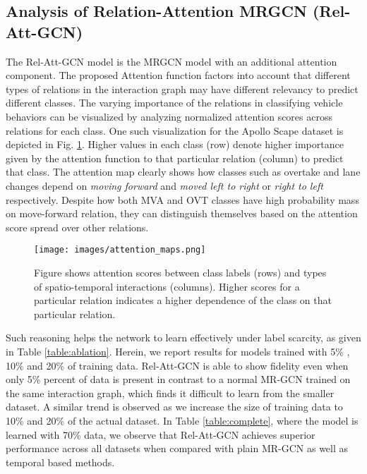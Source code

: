 \documentclass[letterpaper, 10 pt, conference]{ieeeconf}
\begin{document}
\subsection{Analysis of Relation-Attention MRGCN (Rel-Att-GCN)}
The Rel-Att-GCN model is the MRGCN model with an additional attention component. The proposed Attention function factors into account that different types of relations in the interaction graph may have different relevancy to predict different classes.  The varying importance of the relations in classifying vehicle behaviors can be visualized by analyzing normalized attention scores across relations for each class. One such visualization for the Apollo Scape dataset is depicted in Fig. \ref{fig:attention_map}. Higher values in each class (row) denote higher importance given by the attention function to that particular relation (column) to predict that class. The attention map clearly shows how classes such as overtake and lane changes depend on \textit{moving forward} and \textit{moved left to right} or \textit{right to left} respectively. Despite how both MVA and OVT classes have high probability mass on move-forward relation, they can distinguish themselves based on the attention score spread over other relations.
\begin{figure}[!ht]
    \centering
    \vspace{-4mm}
    \texttt{[image: images/attention\_maps.png]}
    \caption{\scriptsize Figure shows attention scores between class labels (rows) and types of spatio-temporal interactions (columns). Higher scores for a particular relation indicates a higher dependence of the class on that particular relation.
}
    \vspace{-2mm}
    \label{fig:attention_map}
\end{figure}

Such reasoning helps the network to learn effectively under label scarcity, as given in Table \ref{table:ablation}. Herein, we report results for models trained with 5\% , 10\% and 20\% of training data. Rel-Att-GCN is able to show fidelity even when only 5\% percent of data is present in contrast to a normal MR-GCN trained on the same interaction graph, which finds it difficult to learn from the smaller dataset. A similar trend is observed as we increase the size of training data to 10\% and 20\% of the actual dataset. In Table \ref{table:complete}, where the model is learned with 70\% data, we observe that Rel-Att-GCN achieves superior performance across all datasets when compared with plain MR-GCN as well as temporal based methods.    
\end{document}
